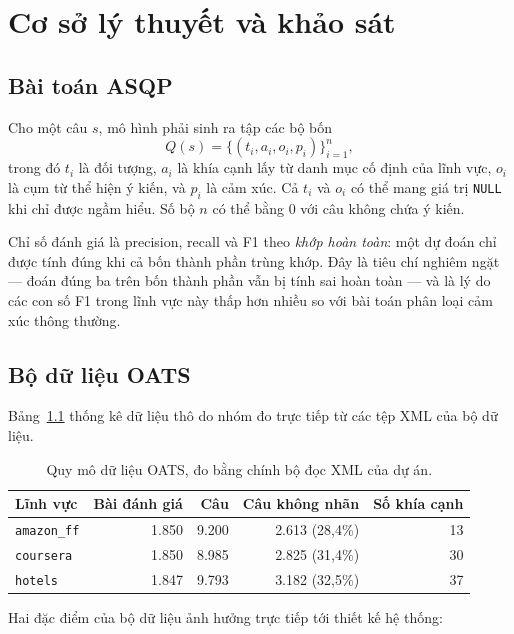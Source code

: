 \documentclass[12pt,a4paper]{report}
\newcommand{\code}[1]{\texttt{#1}}
\begin{document}
\chapter{Cơ sở lý thuyết và khảo sát}
\label{chap:cosoly}

\section{Bài toán ASQP}

Cho một câu $s$, mô hình phải sinh ra tập các bộ bốn
\[
Q(s) = \{(t_i, a_i, o_i, p_i)\}_{i=1}^{n},
\]
trong đó $t_i$ là đối tượng, $a_i$ là khía cạnh lấy từ danh mục cố định của lĩnh vực, $o_i$ là cụm từ thể hiện ý kiến, và
$p_i$ là cảm xúc. Cả $t_i$ và $o_i$ có thể mang giá trị \code{NULL} khi chỉ được ngầm hiểu. Số bộ $n$ có thể bằng 0 với
câu không chứa ý kiến.

Chỉ số đánh giá là precision, recall và F1 theo \emph{khớp hoàn toàn}: một dự đoán chỉ được tính đúng khi cả bốn thành
phần trùng khớp. Đây là tiêu chí nghiêm ngặt --- đoán đúng ba trên bốn thành phần vẫn bị tính sai hoàn toàn --- và là lý
do các con số F1 trong lĩnh vực này thấp hơn nhiều so với bài toán phân loại cảm xúc thông thường.

\section{Bộ dữ liệu OATS}

Bảng~\ref{tab:dulieu} thống kê dữ liệu thô do nhóm đo trực tiếp từ các tệp XML của bộ dữ liệu.

\begin{table}[H]
\centering
\caption{Quy mô dữ liệu OATS, đo bằng chính bộ đọc XML của dự án.}
\label{tab:dulieu}
\begin{tabular}{lrrrr}
\toprule
\textbf{Lĩnh vực} & \textbf{Bài đánh giá} & \textbf{Câu} & \textbf{Câu không nhãn} & \textbf{Số khía cạnh} \\
\midrule
\code{amazon\_ff} & 1.850 & 9.200 & 2.613 (28,4\%) & 13 \\
\code{coursera}   & 1.850 & 8.985 & 2.825 (31,4\%) & 30 \\
\code{hotels}     & 1.847 & 9.793 & 3.182 (32,5\%) & 37 \\
\bottomrule
\end{tabular}
\end{table}

Hai đặc điểm của bộ dữ liệu ảnh hưởng trực tiếp tới thiết kế hệ thống:
\end{document}
